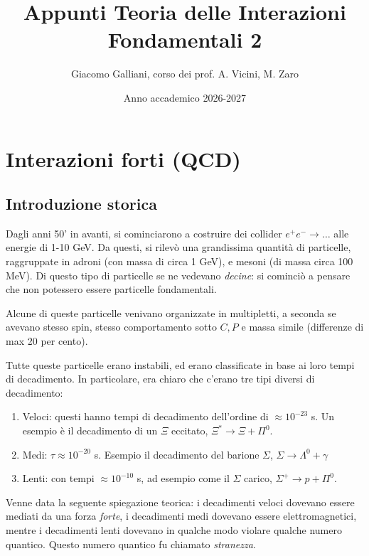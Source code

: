 \documentclass[11pt]{report}
\title{\Huge{\textbf{Appunti Teoria delle Interazioni Fondamentali 2}}}
\author{Giacomo Galliani, corso dei prof. A. Vicini, M. Zaro}
\date{Anno accademico 2026-2027}
\renewcommand{\contentsname}{Indice}
\begin{document}
\maketitle
\newpage%
\pdfbookmark[section]{\contentsname}{toc}
\tableofcontents
\pagebreak

\chapter{Interazioni forti (QCD)}

\section{Introduzione storica}

Dagli anni 50' in avanti, si cominciarono a costruire dei collider \(e^+e^- \to \ldots\) alle energie di 1-10 GeV. Da questi, si rilevò una grandissima quantità di particelle, raggruppate in adroni (con massa di circa 1 GeV), e mesoni (di massa circa 100 MeV). Di questo tipo di particelle se ne vedevano \emph{decine}: si cominciò a pensare che non potessero essere particelle fondamentali. 

Alcune di queste particelle venivano organizzate in multipletti, a seconda se avevano stesso spin, stesso comportamento sotto \(C, P\) e massa simile (differenze di max 20 per cento). 

Tutte queste particelle erano instabili, ed erano classificate in base ai loro tempi di decadimento. In particolare, era chiaro che c'erano tre tipi diversi di decadimento: 

\begin{enumerate}
    \item Veloci: questi hanno tempi di decadimento dell'ordine di \(\approx 10^{-23}\) s. Un esempio è il decadimento di un \(\Xi\) eccitato, \(\Xi^* \to \Xi + \Pi^0\). 
    \item Medi: \(\tau \approx 10^{-20}\) s. Esempio il decadimento del barione \(\Sigma\), \(\Sigma \to \Lambda^0 + \gamma\)
    \item Lenti: con tempi \(\approx 10^{-10}\) s, ad esempio come il \(\Sigma\) carico, \(\Sigma^+ \to p + \Pi^0\). 
\end{enumerate}

Venne data la seguente spiegazione teorica: i decadimenti veloci dovevano essere mediati da una forza \emph{forte}, i decadimenti medi dovevano essere elettromagnetici, mentre i decadimenti lenti dovevano in qualche modo violare qualche numero quantico. Questo numero quantico fu chiamato \emph{stranezza}. 
\end{document}
